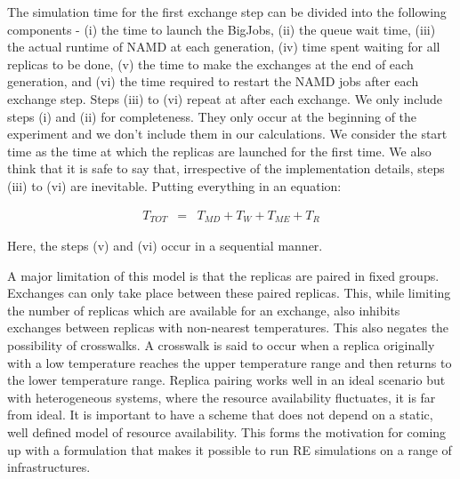 \documentclass[a4paper,10pt]{article}
\newcommand{\jhanote}[1]{ {\textcolor{red} { ***shantenu: #1 }}}
\newcommand{\jhanote}[1]{}
\begin{document}
The simulation time for the first exchange step can be divided into the following components - (i) the time to launch the BigJobs, (ii) the queue wait time, (iii) the actual runtime of NAMD at each generation, (iv) time spent waiting for all replicas to be done, (v) the time to make the exchanges at the end of each generation, and (vi) the time required to restart the NAMD jobs after each exchange step. Steps (iii) to (vi) repeat at after each exchange. We only include steps (i) and (ii) for completeness. They only occur at the beginning of the experiment and we don't include them in our calculations. We consider the start time as the time at which the replicas are launched for the first time. We also think that it is safe to say that, irrespective of the implementation details, steps (iii) to (vi) are inevitable. Putting everything in an equation:

  \begin{eqnarray}
T_{TOT} &=& T_{MD} + T_{W} + T_{ME} + T_{R}
\label{eq:equation 1}
\end{eqnarray}

Here, the steps (v) and (vi) occur in a sequential manner.
 
A major limitation of this model is that the replicas are paired in fixed groups. 
Exchanges can only take place between these paired replicas.
This, while limiting the number of replicas which are available for an exchange, also inhibits exchanges between replicas with non-nearest temperatures. This also negates the possibility of crosswalks. A crosswalk is said to occur when a replica originally with a low temperature reaches the upper temperature range and then returns to the lower temperature range. %
Replica pairing works well in an ideal scenario but with heterogeneous systems, 
where the resource availability fluctuates, it is far from ideal. It is 
important to have a scheme that does not depend on a static, well defined 
model of resource availability. This forms the motivation for coming up 
with a formulation that makes it possible to run RE simulations on a range of infrastructures.
  
\end{document}
